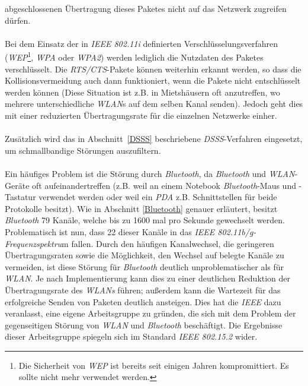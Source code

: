             abgeschlossenen Übertragung dieses Paketes nicht auf das Netzwerk zugreifen
            dürfen.\\
            \\
            Bei dem Einsatz der in \emph{IEEE 802.11i} definierten Verschlüsselungsverfahren
            (\emph{WEP}\footnote{Die Sicherheit von \emph{WEP} ist bereits seit einigen Jahren
             kompromittiert. Es sollte nicht mehr verwendet werden.}, \emph{WPA} oder \emph{WPA2}) werden 
            lediglich die Nutzdaten des Paketes verschlüsselt. Die \emph{RTS/CTS}-Pakete können
            weiterhin erkannt werden, so dass die Kollisionsvermeidung auch dann
            funktioniert, wenn die Pakete nicht entschlüsselt werden können (Diese 
            Situation ist z.B. in Mietshäusern oft anzutreffen, wo mehrere 
            unterschiedliche \emph{WLAN}s auf dem selben Kanal senden). Jedoch geht dies
            mit einer reduzierten Übertragungsrate für die einzelnen Netzwerke
            einher.\\
            \\
            Zusätzlich wird das in Abschnitt~\ref{DSSS} beschriebene \emph{DSSS}-Verfahren
            eingesetzt, um schmallbandige Störungen auszufiltern. \\
            \\
            Ein häufiges Problem ist die Störung durch \emph{Bluetooth}, da 
            \emph{Bluetooth} und \emph{WLAN}-Geräte oft aufeinandertreffen (z.B. weil an einem
            Notebook \emph{Bluetooth}-Maus und -Tastatur verwendet werden oder weil 
            ein \emph{PDA} z.B. Schnittstellen für beide Protokolle besitzt).
            Wie in Abschnitt \ref{Bluetooth} genauer erläutert, besitzt \emph{Bluetooth}
            79 Kanäle, welche bis zu 1600 mal pro Sekunde gewechselt werden.
            Problematisch ist nun, dass 22 dieser Kanäle in das 
            \emph{IEEE 802.11b/g-Frequenzspektru}m fallen. Durch den häufigen
            Kanalwechsel, die geringeren Übertragungsraten sowie die 
            Möglichkeit, den Wechsel auf belegte Kanäle zu vermeiden, ist diese
            Störung für \emph{Bluetooth} deutlich unproblematischer als für \emph{WLAN}.
            Je nach Implementierung kann dies zu einer deutlichen Reduktion
            der Übertragungsrate des \emph{WLANs} führen; außerdem kann die Wartezeit
            für das erfolgreiche Senden von Paketen deutlich ansteigen.
            Dies hat die \emph{IEEE} dazu veranlasst, eine eigene Arbeitsgruppe
            zu gründen, die sich mit dem Problem der gegenseitigen Störung
            von \emph{WLAN} und \emph{Bluetooth} beschäftigt. Die Ergebnisse dieser
            Arbeitsgruppe spiegeln sich im Standard \emph{IEEE 802.15.2} wider.

